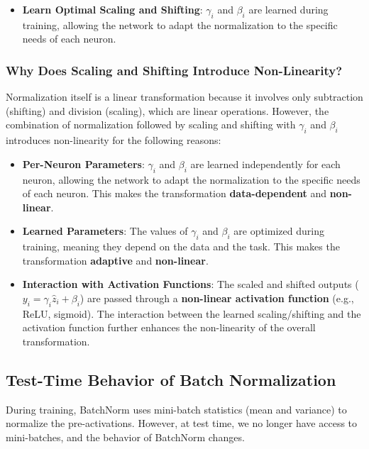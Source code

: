 \begin{notechapter}
\begin{itemize}
    \item \textbf{Learn Optimal Scaling and Shifting}:
    \(\gamma_i\) and \(\beta_i\) are learned during training, allowing the
    network to adapt the normalization to the specific needs of each
    neuron.
\end{itemize}

\subsubsection{Why Does Scaling and Shifting Introduce Non-Linearity?}
Normalization itself is a linear transformation because it involves
only subtraction (shifting) and division (scaling), which are linear
operations. However, the combination of normalization followed by
scaling and shifting with \(\gamma_i\) and \(\beta_i\) introduces
non-linearity for the following reasons:

\begin{itemize}
    \item \textbf{Per-Neuron Parameters}:
    \(\gamma_i\) and \(\beta_i\) are learned independently for each neuron,
    allowing the network to adapt the normalization to the specific needs
    of each neuron. This makes the transformation \textbf{data-dependent} and
    \textbf{non-linear}.

    \item \textbf{Learned Parameters}:
    The values of \(\gamma_i\) and \(\beta_i\) are optimized during training,
    meaning they depend on the data and the task. This makes the transformation
    \textbf{adaptive} and \textbf{non-linear}.

    \item \textbf{Interaction with Activation Functions}:
    The scaled and shifted outputs (\(y_i = \gamma_i \hat{z}_i + \beta_i\))
    are passed through a \textbf{non-linear activation function} (e.g., ReLU, sigmoid).
    The interaction between the learned scaling/shifting and the activation
    function further enhances the non-linearity of the overall transformation.
\end{itemize}

\subsection{Test-Time Behavior of Batch Normalization}
During training, BatchNorm uses mini-batch statistics (mean and variance)
to normalize the pre-activations. However, at test time, we no longer
have access to mini-batches, and the behavior of BatchNorm changes.


\end{notechapter}
